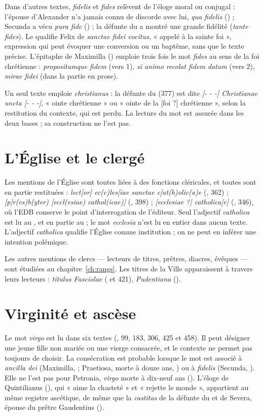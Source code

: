 Dans d’autres textes, \emph{fidelis} et \emph{fides} relèvent de l’éloge moral ou conjugal : l’épouse d’Alexander n’a jamais connu de discorde avec lui, \emph{qua fidelis} () ; Secunda a vécu \emph{pura fide} () ; la défunte du  a montré une grande fidélité (\emph{tante fides}). Le  qualifie Felix de \emph{sanctae fidei vocitus}, « appelé à la sainte foi », expression qui peut évoquer une conversion ou un baptême, sans que le texte précise. L’épitaphe de Maximilla () emploie trois fois le mot \emph{fides} au sens de la foi chrétienne : \emph{propositumque fidem} (vers 1), \emph{si animo recolat fidem datam} (vers 2), \emph{mirae fidei} (dans la partie en prose).

Un seul texte emploie \emph{christianus} : la défunte du  (377) est dite \emph{[- - -] Christianae uncta [- - -]}, « ointe chrétienne » ou « ointe de la [foi ?] chrétienne », selon la restitution du contexte, qui est perdu. La lecture du mot est assurée dans les deux bases ; sa construction ne l’est pas.

\section{L’Église et le clergé}

Les mentions de l’Église sont toutes liées à des fonctions cléricales, et toutes sont en partie restituées : \emph{lect[or] ec(c)les[iae sanctae c]at(h)olic(a)e} (, 362) ; \emph{[p]r(es)b(yter) [eccl(esiae) cathol(icae)]} (, 398) ; \emph{[ecclesiae ?] catholica[e]} (, 346), où l’EDB conserve le point d’interrogation de l’éditeur. Seul l’adjectif \emph{catholica} est lu au , et en partie au  ; le mot \emph{ecclesia} n’est lu en entier dans aucun texte. L’adjectif \emph{catholica} qualifie l’Église comme institution ; on ne peut en inférer une intention polémique.

Les autres mentions de clercs — lecteurs de titres, prêtres, diacres, évêques — sont étudiées au chapitre~\ref{ch:rangs}. Les titres de la Ville apparaissent à travers leurs lecteurs : \emph{titulus Fasciolae} ( et 421), \emph{Pudentiana} ().

\section{Virginité et ascèse}

Le mot \emph{virgo} est lu dans six textes (, 99, 183, 306, 425 et 458). Il peut désigner une jeune fille non mariée ou une vierge consacrée, et le contexte ne permet pas toujours de choisir. La consécration est probable lorsque le mot est associé à \emph{ancilla dei} (Maximilla,  ; Praetiosa, morte à douze ans, ) ou à \emph{fidelis} (Secunda, ). Elle ne l’est pas pour Petronia, \emph{virgo} morte à dix-neuf ans (). L’éloge de Quintilianus (), qui « aime la chasteté » et « rejette le monde », appartient au même registre ascétique, de même que la \emph{castitas} de la défunte du  et de Severa, épouse du prêtre Gaudentius ().


